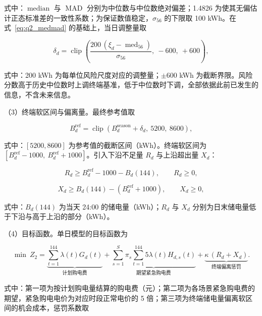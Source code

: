 式中：$\operatorname{median}$ 与 $\operatorname{MAD}$ 分别为中位数与中位数绝对偏差；1.4826 为使其无偏估计正态标准差的一致性系数；为保证数值稳定，$\sigma_{56}$ 的下限取 100 kWh。在式~\eqref{eq:q2_medmad} 的基础上，当日调整量取

\begin{equation}
  \delta_d = \operatorname{clip}\!\left(\frac{200\,(\xi_d - \operatorname{med}_{56})}{\sigma_{56}},\ -600,\ +600\right),
  \label{eq:q2_riskadj}
\end{equation}

式中：200 kWh 为每单位风险尺度对应的调整量；$\pm600$ kWh 为截断界限。风险分数高于历史中位数时上调终端基准，低于中位数时下调，全部依据此前已发生的信息，不含未来信息。

（3）终端软区间与偏离量。最终参考值取

\begin{equation}
  B_d^{\mathrm{ref}} = \operatorname{clip}\!\left(B_d^{\mathrm{season}} + \delta_d,\ 5200,\ 8600\right),
  \label{eq:q2_ref}
\end{equation}

式中：$[5200,8600]$ 为参考值的截断区间（kWh）。终端软区间为 $[B_d^{\mathrm{ref}}-1000,\ B_d^{\mathrm{ref}}+1000]$。引入下沿不足量 $R_d$ 与上沿超出量 $X_d$：

\begin{equation}
  R_d \ge B_d^{\mathrm{ref}} - 1000 - B_d(144), \qquad R_d \ge 0,
  \label{eq:q2_lower}
\end{equation}

\begin{equation}
  X_d \ge B_d(144) - \left(B_d^{\mathrm{ref}} + 1000\right), \qquad X_d \ge 0,
  \label{eq:q2_upper}
\end{equation}

式中：$B_d(144)$ 为当天 24:00 的储电量（kWh）；$R_d$ 与 $X_d$ 分别为日末储电量低于下沿与高于上沿的部分（kWh）。

（4）目标函数。单日模型的目标函数为

\begin{equation}
  \min\ Z_2 = \underbrace{\sum_{t=1}^{144} \lambda(t) G_d(t)}_{\text{计划购电费}}
  + \underbrace{\sum_{s=1}^{S} \pi_s \sum_{t=1}^{144} 5\lambda(t) H_{d,s}(t)}_{\text{期望紧急购电费}}
  + \underbrace{\kappa\,(R_d + X_d)}_{\text{终端偏离惩罚}}.
  \label{eq:q2_obj}
\end{equation}

式中：第一项为按计划购电量结算的购电费（元）；第二项为各场景紧急购电费的期望，紧急购电电价为对应时段正常电价的 5 倍；第三项为终端储电量偏离软区间的机会成本，惩罚系数取

